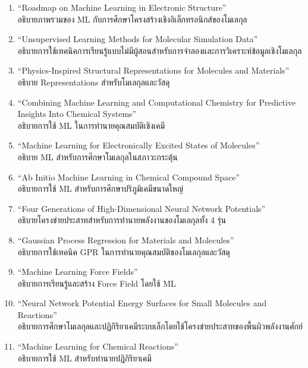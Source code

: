 \begin{enumerate}
    \item \enquote{Roadmap on Machine Learning in Electronic Structure}\autocite{kulik2022}\\
    อธิบายภาพรวมของ ML กับการศึกษาโครงสร้างเชิงอิเล็กทรอนิกส์ของโมเลกุล
    
    \item \enquote{Unsupervised Learning Methods for Molecular Simulation Data}\autocite{glielmo2021}\\
    อธิบายการใช้เทคนิคการเรียนรู้แบบไม่มีผู้สอนสำหรับการจำลองและการวิเคราะห์ข้อมูลเชิงโมเลกุล

    \item \enquote{Physics-Inspired Structural Representations for Molecules and Materials}\autocite{musil2021}\\
    อธิบาย Representations สำหรับโมเลกุลและวัสดุ

    \item \enquote{Combining Machine Learning and Computational Chemistry for Predictive Insights Into Chemical 
    Systems}\autocite{keith2021}\\
    อธิบายการใช้ ML ในการทำนายคุณสมบัติเชิงเคมี

    \item \enquote{Machine Learning for Electronically Excited States of Molecules}\autocite{westermayr2021a}\\
    อธิบาย ML สำหรับการศึกษาโมเลกุลในสภาวะกระตุ้น

    \item \enquote{Ab Initio Machine Learning in Chemical Compound Space}\autocite{huang2021}\\
    อธิบายการใช้ ML สำหรับการศึกษาปริภูมิเคมีขนาดใหญ่

    \item \enquote{Four Generations of High-Dimensional Neural Network Potentials}\autocite{behler2021}\\
    อธิบายโครงข่ายประสาทสำหรับการทำนายพลังงานของโมเลกุลทั้ง 4 รุ่น

    \item \enquote{Gaussian Process Regression for Materials and Molecules}\autocite{deringer2021}\\
    อธิบายการใช้เทคนิค GPR ในการทำนายคุณสมบัติของโมเลกุลและวัสดุ

    \item \enquote{Machine Learning Force Fields}\autocite{unke2021}\\
    อธิบายการเรียนรู้และสร้าง Force Field โดยใช้ ML

    \item \enquote{Neural Network Potential Energy Surfaces for Small Molecules and Reactions}\autocite{manzhos2021}\\
    อธิบายการศึกษาโมเลกุลและปฏิกิริยาเคมีระบบเล็กโดยใช้โครงข่ายประสาทของพื้นผิวพลังงานศักย์

    \item \enquote{Machine Learning for Chemical Reactions}\autocite{meuwly2021}\\
    อธิบายการใช้ ML สำหรับทำนายปฏิกิริยาเคมี

\end{enumerate}
